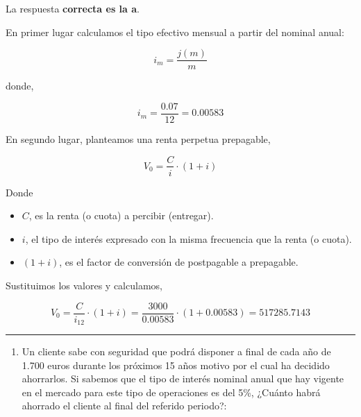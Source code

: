 \documentclass[
  letterpaper,
  DIV=11,
  numbers=noendperiod]{scrreprt}
\providecommand{\tightlist}{%
  \setlength{\itemsep}{0pt}\setlength{\parskip}{0pt}}\usepackage{longtable,booktabs,array}
\begin{document}
\begin{tcolorbox}[enhanced jigsaw, left=2mm, opacityback=0, colback=white, breakable, arc=.35mm, bottomrule=.15mm, rightrule=.15mm, toprule=.15mm, leftrule=.75mm, colframe=quarto-callout-tip-color-frame]
\begin{minipage}[t]{5.5mm}
\textcolor{quarto-callout-tip-color}{\faLightbulb}
\end{minipage}%
\begin{minipage}[t]{\textwidth - 5.5mm}

La respuesta \textbf{correcta es la a}.

En primer lugar calculamos el tipo efectivo mensual a partir del nominal
anual:

\[i_m=\frac{j\left(m\right)}{m}\]

donde,

\[i_m=\frac{0.07}{12}=0.00583\]

En segundo lugar, planteamos una renta perpetua prepagable,

\[V_0=\frac{C}{i}\cdot\left(1+i\right)\]

Donde

\begin{itemize}
\item
  \(C\), es la renta (o cuota) a percibir (entregar).
\item
  \(i\), el tipo de interés expresado con la misma frecuencia que la
  renta (o cuota).
\item
  \(\left(1+i\right)\), es el factor de conversión de postpagable a
  prepagable.
\end{itemize}

Sustituimos los valores y calculamos,

\[V_0=\frac{C}{i_{12}}\cdot\left(1+i\right)=\frac{3000}{0.00583}\cdot\left(1+0.00583\right)=517285.7143\]

\end{minipage}%
\end{tcolorbox}

\begin{center}\rule{0.5\linewidth}{0.5pt}\end{center}

\begin{enumerate}
\def\labelenumi{\arabic{enumi}.}
\setcounter{enumi}{84}
\tightlist
\item
  Un cliente sabe con seguridad que podrá disponer a final de cada año
  de 1.700 euros durante los próximos 15 años motivo por el cual ha
  decidido ahorrarlos. Si sabemos que el tipo de interés nominal anual
  que hay vigente en el mercado para este tipo de operaciones es del
  5\%, ¿Cuánto habrá ahorrado el cliente al final del referido periodo?:
\end{enumerate}
\end{document}
